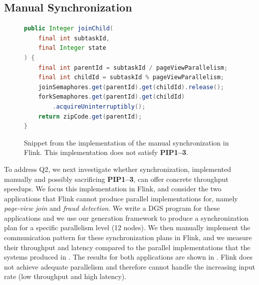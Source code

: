 \subsection{Manual Synchronization}
\label{dgs:ssec:performance-evaluation}

\begin{figure}[t]
  \centering
  \begin{minipage}{0.9\textwidth}
  \begin{lstlisting}[language=Java,basicstyle=\small\ttfamily,morekeywords={var}]
public Integer joinChild(
    final int subtaskId,
    final Integer state
) {
    final int parentId = subtaskId / pageViewParallelism;
    final int childId = subtaskId % pageViewParallelism;
    joinSemaphores.get(parentId).get(childId).release();
    forkSemaphores.get(parentId).get(childId)
        .acquireUninterruptibly();
    return zipCode.get(parentId);
}
  \end{lstlisting}
  \end{minipage}
  \caption[Flink code snippet.]{Snippet from the implementation of the manual synchronization  in Flink. This implementation does not satisfy \textbf{PIP1--3}.}
  \label{dgs:fig:flink-snippet}
\end{figure}

\noindent
To address Q2, we next investigate whether synchronization, implemented manually and possibly sacrificing \textbf{PIP1--3}, can offer concrete throughput speedups.
We focus this implementation in Flink, and consider the two applications that Flink cannot produce parallel implementations for, namely \emph{page-view join} and \emph{fraud detection}. We write a DGS program for these applications and we use our generation framework to produce a synchronization plan for a specific parallelism level (12 nodes). We then manually implement the communication pattern for these synchronization plans in Flink, and we measure their throughput and latency compared to the parallel implementations that the systems produced in . The results for both applications are shown in . Flink does not achieve adequate parallelism and therefore cannot handle the increasing input rate (low throughput and high latency).

